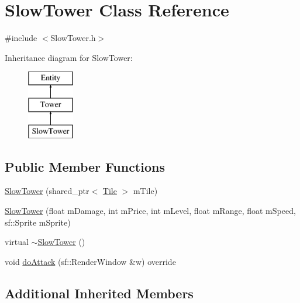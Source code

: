 \hypertarget{class_slow_tower}{\section{Slow\+Tower Class Reference}
\label{class_slow_tower}
}


{\ttfamily \#include $<$Slow\+Tower.\+h$>$}

Inheritance diagram for Slow\+Tower\+:\begin{figure}[H]
\begin{center}
\leavevmode
\includegraphics[height=3.000000cm]{class_slow_tower}
\end{center}
\end{figure}
\subsection*{Public Member Functions}
\begin{DoxyCompactItemize}
\item 
\hyperlink{class_slow_tower_a05ce0356b1d846450e3c522d5558974f}{Slow\+Tower} (shared\+\_\+ptr$<$ \hyperlink{class_tile}{Tile} $>$ m\+Tile)
\item 
\hyperlink{class_slow_tower_af7681fbf8310e36d9933ad0f76747958}{Slow\+Tower} (float m\+Damage, int m\+Price, int m\+Level, float m\+Range, float m\+Speed, sf\+::\+Sprite m\+Sprite)
\item 
virtual \hyperlink{class_slow_tower_ab0401cca62dc2cff530fe29e5a6baed9}{$\sim$\+Slow\+Tower} ()
\item 
void \hyperlink{class_slow_tower_a263531cb94fccecfdc1bd667a54b168d}{do\+Attack} (sf\+::\+Render\+Window \&w) override
\end{DoxyCompactItemize}
\subsection*{Additional Inherited Members}


